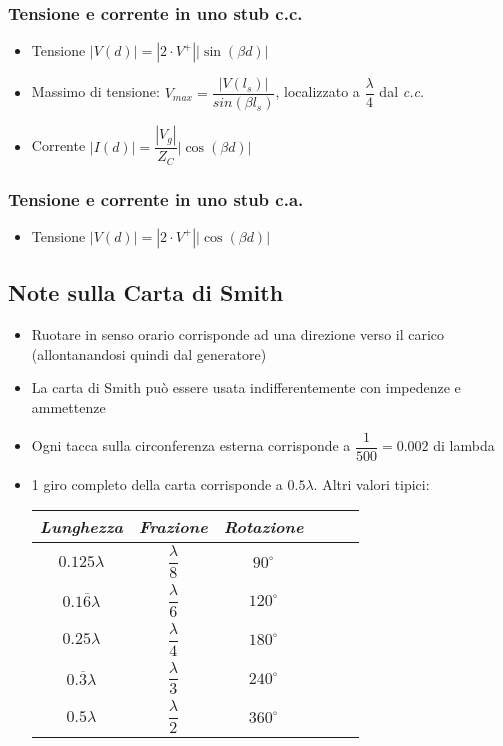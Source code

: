 \documentclass{article}
\begin{document}
\subsubsection{Tensione e corrente in uno stub c.c.}
\begin{itemize}
		\item Tensione \( |V(d)| = |2 \cdot V^+ | \left| \sin(\beta d) \right| \)
		\item Massimo di tensione: \( V_{max} = \dfrac{|V(l_s)|}{sin(\beta l_s)} \), localizzato a \( \dfrac{\lambda}{4} \) dal \textit{c.c.}
		\item Corrente \( |I(d)| = \dfrac{|V_g|}{Z_C} |\cos (\beta d) |\)
\end{itemize}

\subsubsection{Tensione e corrente in uno stub c.a.}
\begin{itemize}
	\item Tensione \( |V(d)| = |2 \cdot V^+ | \left| \cos(\beta d) \right| \)
\end{itemize}


\subsection{Note sulla Carta di Smith}
\begin{itemize}
	\item Ruotare in senso orario corrisponde ad una direzione verso il carico (allontanandosi quindi dal generatore)
	\item La carta di Smith può essere usata indifferentemente con impedenze e ammettenze
	\item Ogni tacca sulla circonferenza esterna corrisponde a \( \dfrac{1}{500} = 0.002 \) di lambda
	\item 1 giro completo della carta corrisponde a \(0.5 \lambda\). Altri valori tipici:
	\vspace{5pt}
	\begin{center}
		\begin{tabular}{|Sc|Sc|Sc|}
			\hline 
			\textit{Lunghezza} & \textit{Frazione} & \textit{Rotazione} \\ 
			\hline 	
			\(0.125 \lambda\) & \(\dfrac{\lambda}{8}\) & \(90^\circ\) \\ 
			\hline 
			\(0.1\overline{6} \lambda\) & \(\dfrac{\lambda}{6}\) & \(120^\circ\) \\ 
			\hline 
			\(0.25 \lambda\) & \(\dfrac{\lambda}{4}\) & \(180^\circ\) \\ 
			\hline 
			\(0.\overline{3} \lambda\) & \(\dfrac{\lambda}{3}\) &\(240^\circ\) \\
			\hline
			\(0.5 \lambda\) & \(\dfrac{\lambda}{2}\) & \(360^\circ\) \\ 
			\hline 
		\end{tabular} 
	\end{center}
	\vspace{5pt}
\end{itemize}
\end{document}
